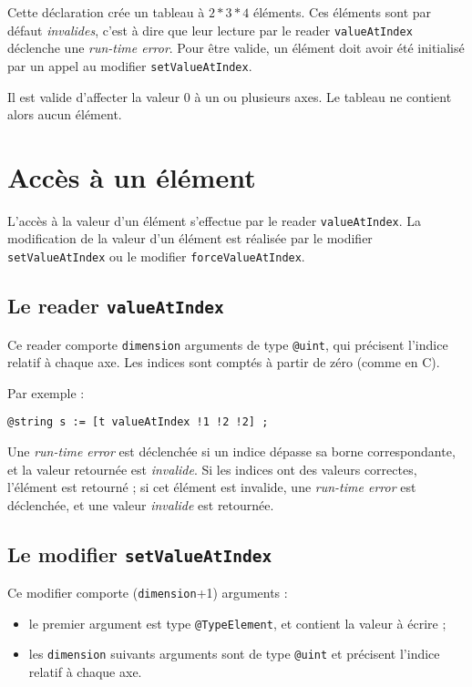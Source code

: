Cette déclaration crée un tableau à $2*3*4$ éléments. Ces éléments sont par défaut \emph{invalides}, c'est à dire que leur lecture par le reader \lstinline[language=galgas]!valueAtIndex! déclenche une \emph{run-time error}. Pour être valide, un élément doit avoir été initialisé par un appel au modifier \lstinline[language=galgas]!setValueAtIndex!.

Il est valide d'affecter la valeur $0$ à un ou plusieurs axes. Le tableau ne contient alors aucun élément.


\section{Accès à un élément}

L'accès à la valeur d'un élément s'effectue par le reader \lstinline[language=galgas]!valueAtIndex!. La modification de la valeur d'un élément est réalisée par le modifier \lstinline[language=galgas]!setValueAtIndex! ou le modifier \lstinline[language=galgas]!forceValueAtIndex!.

\subsection{Le reader \lstinline[language=galgas]!valueAtIndex!}

Ce reader comporte \lstinline[language=galgas]!dimension! arguments de type \lstinline[language=galgas]!@uint!, qui précisent l'indice relatif à chaque axe. Les indices sont comptés à partir de zéro (comme en C).

Par exemple :
\begin{lstlisting}[language=galgas]
  @string s := [t valueAtIndex !1 !2 !2] ;
\end{lstlisting}


Une \emph{run-time error} est déclenchée si un indice dépasse sa borne correspondante, et la valeur retournée est \emph{invalide}. Si les indices ont des valeurs correctes, l'élément est retourné ; si cet élément est invalide, une \emph{run-time error} est déclenchée, et une valeur \emph{invalide} est retournée.






\subsection{Le modifier \lstinline[language=galgas]!setValueAtIndex!}

Ce modifier comporte (\lstinline[language=galgas]!dimension!+1) arguments :
\begin{itemize}
  \item le premier argument est type \lstinline[language=galgas]!@TypeElement!, et contient la valeur à écrire ;
  \item les \lstinline[language=galgas]!dimension! suivants arguments sont de type \lstinline[language=galgas]!@uint! et précisent l'indice relatif à chaque axe.
\end{itemize} 
  
